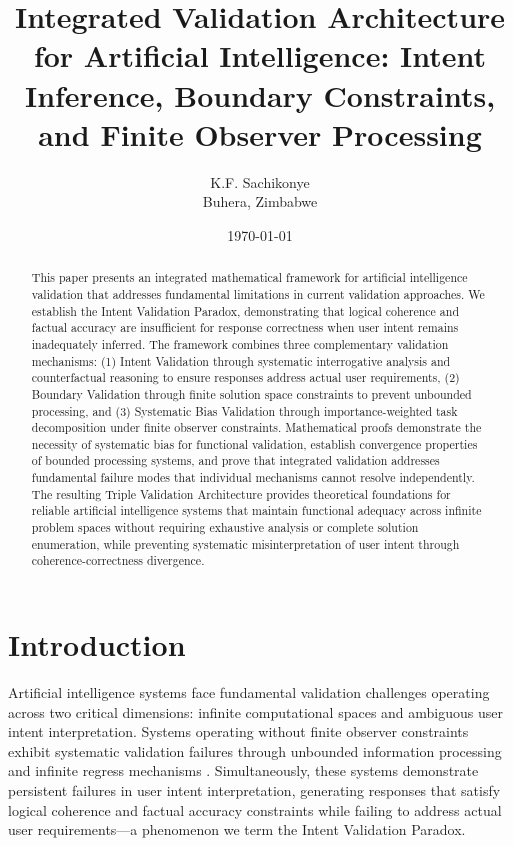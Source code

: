 \documentclass[12pt,a4paper]{article}
\title{Integrated Validation Architecture for Artificial Intelligence: Intent Inference, Boundary Constraints, and Finite Observer Processing}
\author{
K.F. Sachikonye\\
Buhera, Zimbabwe
}
\date{\today}
\begin{document}
\maketitle

\begin{abstract}
This paper presents an integrated mathematical framework for artificial intelligence validation that addresses fundamental limitations in current validation approaches. We establish the Intent Validation Paradox, demonstrating that logical coherence and factual accuracy are insufficient for response correctness when user intent remains inadequately inferred. The framework combines three complementary validation mechanisms: (1) Intent Validation through systematic interrogative analysis and counterfactual reasoning to ensure responses address actual user requirements, (2) Boundary Validation through finite solution space constraints to prevent unbounded processing, and (3) Systematic Bias Validation through importance-weighted task decomposition under finite observer constraints. Mathematical proofs demonstrate the necessity of systematic bias for functional validation, establish convergence properties of bounded processing systems, and prove that integrated validation addresses fundamental failure modes that individual mechanisms cannot resolve independently. The resulting Triple Validation Architecture provides theoretical foundations for reliable artificial intelligence systems that maintain functional adequacy across infinite problem spaces without requiring exhaustive analysis or complete solution enumeration, while preventing systematic misinterpretation of user intent through coherence-correctness divergence.
\end{abstract}

\section{Introduction}

Artificial intelligence systems face fundamental validation challenges operating across two critical dimensions: infinite computational spaces and ambiguous user intent interpretation. Systems operating without finite observer constraints exhibit systematic validation failures through unbounded information processing and infinite regress mechanisms \citep{turing1936,church1936}. Simultaneously, these systems demonstrate persistent failures in user intent interpretation, generating responses that satisfy logical coherence and factual accuracy constraints while failing to address actual user requirements—a phenomenon we term the Intent Validation Paradox.
\end{document}
